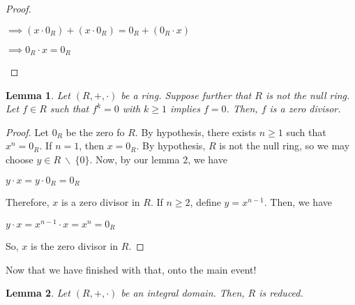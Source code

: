 \documentclass[executivepaper]{article}
\newtheorem{lemma}{Lemma}
\begin{document}
\begin{flushleft}
\begin{proof}
\begin{center}
$\implies \left(x \cdot 0_{R}\right) + \left(x \cdot 0_{R}\right)=0_{R} + \left(0_{R} \cdot x\right)$

\vspace{2mm}

$\implies 0_{R} \cdot x=0_{R}$

\end{center}

\end{proof}

\vspace{3mm}

\begin{lemma}

Let $\left(R, +, \cdot \right)$ be a ring. Suppose further that $R$ is not the null ring. Let $f \in R$ such that $f^{k}=0$ with $k \geq 1$ implies $f=0$. Then, $f$ is a zero divisor.

\end{lemma}

\begin{proof}

Let $0_{R}$ be the zero fo $R$. By hypothesis, there exists $n \geq 1$ such that $x^{n}=0_{R}$. If $n=1$, then $x=0_{R}$. By hypothesis, $R$ is not the null ring, so we may choose $y \in R ~ \backslash ~ \{0\}$. Now, by our lemma 2, we have

\begin{center}

$y \cdot x=y \cdot 0_{R}=0_{R}$

\end{center}

Therefore, $x$ is a zero divisor in $R$. If $ n \geq 2$, define $y=x^{n-1}$. Then, we have

\begin{center}

$y \cdot x=x^{n-1} \cdot x=x^{n}=0_{R}$

\end{center}

So, $x$ is the zero divisor in $R$.

\end{proof}

Now that we have finished with that, onto the main event!

\vspace{2mm}

\begin{lemma}

Let $\left(R, +, \cdot\right)$ be an integral domain. Then, $R$ is reduced.


\end{lemma}
\end{flushleft}
\end{document}

